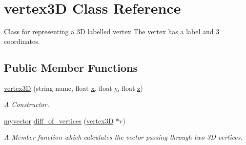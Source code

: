 \hypertarget{classvertex3D}{}\section{vertex3D Class Reference}
\label{classvertex3D}


Class for representing a 3D labelled vertex The vertex has a label and 3 coordinates.  


\subsection*{Public Member Functions}
\begin{DoxyCompactItemize}
\item 
\hyperlink{classvertex3D_a82301ce369a5bff49f467f73b93e3d67}{vertex3D} (string name, float \hyperlink{classvertex3D_a6c6ee4315d72adbc5abb17e6af802087}{x}, float \hyperlink{classvertex3D_aa1f4823bf2a3f648b1b0b39ef7ea5891}{y}, float \hyperlink{classvertex3D_a67f3819dff895cb47284c34ec85658d7}{z})
\begin{DoxyCompactList}\small\item\em A Constructor. \end{DoxyCompactList}\item 
\hyperlink{classmyvector}{myvector} \hyperlink{classvertex3D_aaf451bdb095243ff34d788648aa8ff29}{diff\+\_\+of\+\_\+vertices} (\hyperlink{classvertex3D}{vertex3D} $\ast$v)
\begin{DoxyCompactList}\small\item\em A Member function which calculates the vector passing through two 3D vertices. \end{DoxyCompactList}\end{DoxyCompactItemize}

